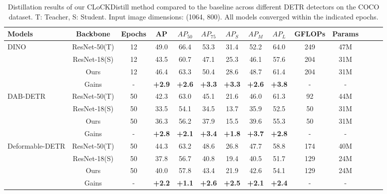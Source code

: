 \begin{table*}[h]
    \centering
    \addtolength{\tabcolsep}{-0.2pt}
    \begin{tabular}{lccccccccccccc}
        \toprule
        Models & Backbone & Epochs & AP & $AP_{50}$ & $AP_{75}$ & $AP_S$ & $AP_M$ & $AP_L$ & GFLOPs & Params \\
        \midrule
        \multirow{4}{*}{DINO} & ResNet-50(T) & 12 & 49.0 & 66.4 & 53.3 & 31.4 & 52.2 & 64.0 & 249 & 47M\\
         & ResNet-18(S) & 12 & 43.5 & 60.7 & 47.1 & 25.3 & 46.1 & 57.6 & 204 & 31M\\
         & Ours & 12 & 46.4 & 63.3 & 50.4 & 28.6 & 48.7 & 61.4 &204 & 31M \\
         & Gains & - & \textbf{+2.9} & \textbf{+2.6} & \textbf{+3.3} & \textbf{+3.3} & \textbf{+2.6} & \textbf{+3.8} & - & -
         \\
        \midrule
        \multirow{4}{*}{DAB-DETR} & ResNet-50(T) & 50 & 42.3 & 63.0 & 45.1 & 21.6 & 46.0 & 61.3 & 92 & 44M\\
         & ResNet-18(S) & 50 & 33.5 & 54.1 & 34.5 & 13.7 & 35.9 & 52.5 & 50 & 31M\\
         & Ours & 50 & 36.3 & 56.2 & 37.9 & 15.5 & 39.6 & 55.3 & 50 & 31M \\
         & Gains & - & \textbf{+2.8} & \textbf{+2.1} & \textbf{+3.4} & \textbf{+1.8} & \textbf{+3.7} & \textbf{+2.8} & - & -
         \\
        \midrule
        \multirow{4}{*}{Deformable-DETR} & ResNet-50(T) & 50 & 44.3 & 63.2 & 48.6 & 26.8 & 47.7 & 58.8 & 174 & 40M\\
         & ResNet-18(S) & 50 & 37.8 & 56.7 & 40.8 & 19.4 & 40.5 & 51.7 & 129 & 24M \\
         & Ours & 50 & 40.0 & 57.8 & 43.4 & 21.9 & 42.6 & 54.1 & 129 & 24M \\
         & Gains & - & \textbf{+2.2} & \textbf{+1.1} & \textbf{+2.6} & \textbf{+2.5} & \textbf{+2.1} & \textbf{+2.4} & - & -
         \\
        \bottomrule
    \end{tabular}
    \caption{Distillation results of our CLoCKDistill method compared to the baseline across different DETR detectors on the COCO dataset. T: Teacher, S: Student. Input image dimensions: (1064, 800). All models converged within the indicated epochs.}
    \label{tab:COCO}
\end{table*}
